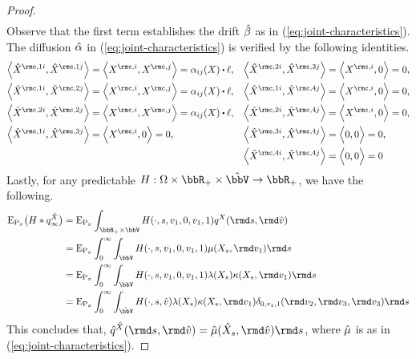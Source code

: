 \begin{proof}
\begin{align*}
  \end{align*}
  Observe that the first term establishes the drift $\hat{\beta}$ as in (\ref{eq:joint-characteristics}).
  The diffusion $\hat{\alpha}$ in (\ref{eq:joint-characteristics}) is verified by the following identities.
  \begin{align*}
    \Bprj{\hat\X^{\rmc,1i}}{\hat\X^{\rmc,1j}} &= \Bprj{\X^{\rmc,i}}{\X^{\rmc,j}} = \affDiff_{ij}(\X) \shortInt \leb, &
    \Bprj{\hat\X^{\rmc,2i}}{\hat\X^{\rmc,3j}} &= \Bprj{\X^{\rmc,i}}{0} = 0, \\
    \Bprj{\hat\X^{\rmc,1i}}{\hat\X^{\rmc,2j}} &= \Bprj{\X^{\rmc,i}}{\X^{\rmc,j}} = \affDiff_{ij}(\X) \shortInt \leb, &
    \Bprj{\hat\X^{\rmc,1i}}{\hat\X^{\rmc,4j}} &= \Bprj{\X^{\rmc,i}}{0} = 0, \\
    \Bprj{\hat\X^{\rmc,2i}}{\hat\X^{\rmc,2j}} &= \Bprj{\X^{\rmc,i}}{\X^{\rmc,j}} = \affDiff_{ij}(\X) \shortInt \leb, &
    \Bprj{\hat\X^{\rmc,2i}}{\hat\X^{\rmc,4j}} &= \Bprj{\X^{\rmc,i}}{0} = 0,  \\
    \Bprj{\hat\X^{\rmc,1i}}{\hat\X^{\rmc,3j}} &= \Bprj{\X^{\rmc,i}}{0} = 0, &
    \Bprj{\hat\X^{\rmc,3i}}{\hat\X^{\rmc,4j}} &= \Bprj{0}{0} = 0, \\
    &&\Bprj{\hat\X^{\rmc,4i}}{\hat\X^{\rmc,4j}} &= \Bprj{0}{0} = 0
  \end{align*}
  Lastly, for any predictable $H: \Omega \times \bbR_+ \times \hat\vecSpace \rightarrow \bbR_+$, we have the following.
  \begin{align*}
    \Exp_{\Prb_\stateVar} \big( H \ast \jumpMeas^{\hat\X}_\infty \big)
    &= \Exp_{\Prb_\stateVar} \int_{\bbR_+\times\vecSpace} H(\cdot, s, \markVar_1, 0, \markVar_1, 1) \jumpMeas^\X(\rmd s, \rmd\hat\markVar) \\
    &= \Exp_{\Prb_\stateVar} \int_0^\infty \int_\vecSpace H(\cdot, s, \markVar_1, 0, \markVar_1, 1) \affJump(\X_s, \rmd\markVar_1) \rmd s \\
    &= \Exp_{\Prb_\stateVar} \int_0^\infty \int_\vecSpace H(\cdot, s, \markVar_1, 0, \markVar_1, 1) \affInt(\X_s) \affDist(\X_s, \rmd\markVar_1)  \rmd s \\
    &= \Exp_{\Prb_\stateVar} \int_0^\infty \int_{\hat\vecSpace} H(\cdot, s, \hat\markVar) \affInt(\X_s) \affDist(\X_s, \rmd\markVar_1) \delta_{0,\markVar_1,1}(\rmd\markVar_2,\rmd\markVar_3,\rmd\markVar_3)  \rmd s
  \end{align*}
  This concludes that, $\predproj{\jumpMeas^{\hat\X}}(\rmd s, \rmd\hat\markVar) = \hat\affJump(\hat\X_s, \rmd\hat\markVar) \rmd s$, where $\hat{\mu}$ is as in (\ref{eq:joint-characteristics}).

\end{proof}

